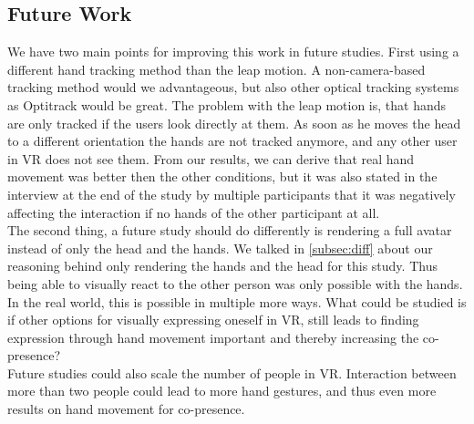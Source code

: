 \documentclass[english,runningheads,a4paper]{llncs}[2018/03/10]
\begin{document}
\subsection{Future Work}
We have two main points for improving this work in future studies.
First using a different hand tracking method than the leap motion.
A non-camera-based tracking method would we advantageous, but also other optical tracking systems as Optitrack would be great.
The problem with the leap motion is, that hands are only tracked if the users look directly at them.
As soon as he moves the head to a different orientation the hands are not tracked anymore, and any other user in VR does not see them.
From our results, we can derive that real hand movement was better then the other conditions, but it was also stated in the interview at the end of the study by multiple participants that it was negatively affecting the interaction if no hands of the other participant at all. \\ \linebreak
The second thing, a future study should do differently is rendering a full avatar instead of only the head and the hands.
We talked in \cref{subsec:diff} about our reasoning behind only rendering the hands and the head for this study.
Thus being able to visually react to the other person was only possible with the hands.
In the real world, this is possible in multiple more ways.
What could be studied is if other options for visually expressing oneself in VR, still leads to finding expression through hand movement important and thereby increasing the co-presence? \\ \linebreak
Future studies could also scale the number of people in VR. 
Interaction between more than two people could lead to more hand gestures, and thus even more results on hand movement for co-presence.




\end{document}
